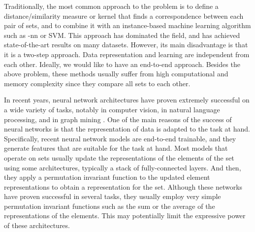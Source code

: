 \documentclass[twoside]{article}
\begin{document}
Traditionally, the most common approach to the problem is to define a distance/similarity measure or kernel that finds a correspondence between each pair of sets, and to combine it with an instance-based machine learning algorithm such as -nn or SVM.
This approach has dominated the field, and has achieved state-of-the-art results on many datasets.
However, its main disadvantage is that it is a two-step approach.
Data representation and learning are independent from each other.
Ideally, we would like to have an end-to-end approach.
Besides the above problem, these methods usually suffer from high computational and memory complexity since they compare all sets to each other.

In recent years, neural network architectures have proven extremely successful on a wide variety of tasks, notably in computer vision, in natural language processing, and in graph mining \citep{lecun2015deep}.
One of the main reasons of the success of neural networks is that the representation of data is adapted to the task at hand.
Specifically, recent neural network models are end-to-end trainable, and they generate features that are suitable for the task at hand.
Most models that operate on sets usually update the representations of the elements of the set using some architectures, typically a stack of fully-connected layers.
And then, they apply a permutation invariant function to the updated element representations to obtain a representation for the set.
Although these networks have proven successful in several tasks, they usually employ very simple permutation invariant functions such as the sum or the average of the representations of the elements.
This may potentially limit the expressive power of these architectures.
\end{document}
